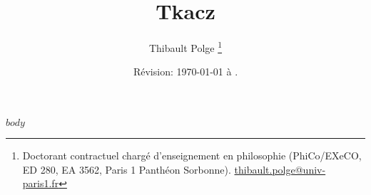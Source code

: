 \documentclass[11pt, french, oneside]{book}
\begin{document}
\title{Tkacz}
\author{Thibault Polge%
\thanks{Doctorant contractuel chargé d'enseignement en philosophie (PhiCo/EXeCO, ED
280, EA 3562, Paris 1 Panthéon Sorbonne). \href{mailto:thibault.polge@univ-paris1.fr}{thibault.polge@univ-paris1.fr}
}
}

\date{Révision: \today{} à \currenttime.}
\date{}

\maketitle




$body$
\end{document}
